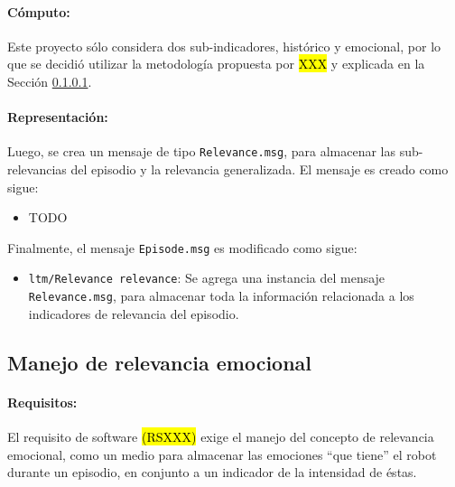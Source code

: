 \paragraph{Cómputo:}
Este proyecto sólo considera dos sub-indicadores, histórico y emocional, por lo que se decidió utilizar la metodología propuesta por \hl{XXX} \cite{} y explicada en la Sección \ref{}.


\paragraph{Representación:}
Luego, se crea un mensaje de tipo \texttt{Relevance.msg}, para almacenar las sub-relevancias del episodio y la relevancia generalizada. El mensaje es creado como sigue:
\begin{itemize}
\item TODO
\end{itemize}

Finalmente, el mensaje \texttt{Episode.msg} es modificado como sigue:
\begin{itemize}
	\item \texttt{ltm/Relevance relevance}: Se agrega una instancia del mensaje \texttt{Relevance.msg}, para almacenar toda la información relacionada a los indicadores de relevancia del episodio.
\end{itemize}


\subsection{Manejo de relevancia emocional}

\paragraph{Requisitos:}
El requisito de software \hl{(RSXXX)} exige el manejo del concepto de relevancia emocional, como un medio para almacenar las emociones ``que tiene'' el robot durante un episodio, en conjunto a un indicador de la intensidad de éstas.


